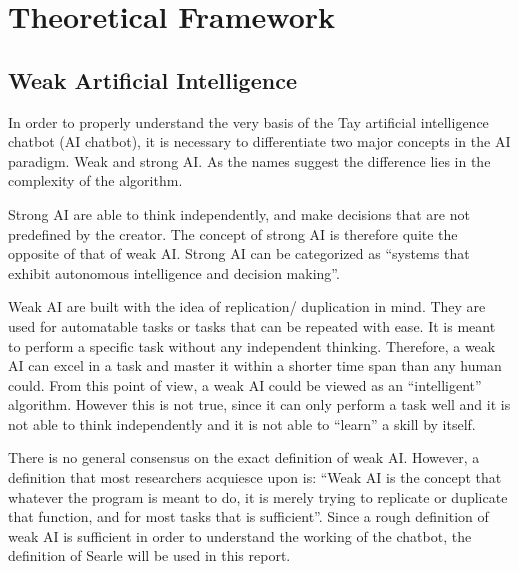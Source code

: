 \chapter{Theoretical Framework}

\section{Weak Artificial Intelligence}
In order to properly understand the very basis of the Tay artificial intelligence chatbot (AI chatbot), it is necessary to differentiate two major concepts in the AI paradigm. Weak and strong AI. As the names suggest the difference lies in the complexity of the algorithm.

Strong AI are able to think independently, and make decisions that are not predefined by the creator. The concept of strong AI is therefore quite the opposite of that of weak AI. Strong AI can be categorized as “systems that exhibit autonomous intelligence and decision making”\cite{AIdefinitions}.

Weak AI are built with the idea of replication/ duplication in mind. They are used for automatable tasks or tasks that can be repeated with ease. It is meant to perform a specific task without any independent thinking. Therefore, a weak AI can excel in a task and master it within a shorter time span than any human could. From this point of view, a weak AI could be viewed as an “intelligent” algorithm. However this is not true, since it can only perform a task well and it is not able to think independently and it is not able to “learn” a skill by itself.

There is no general consensus on the exact definition of weak AI. However, a definition that most researchers acquiesce upon is: “Weak AI is the concept that whatever the program is meant to do, it is merely trying to replicate or duplicate that function, and for most tasks that is sufficient”\cite{searleAIdefinition}. Since a rough definition of weak AI is sufficient in order to understand the working of the chatbot, the definition of Searle will be used in this report.

\newpage

